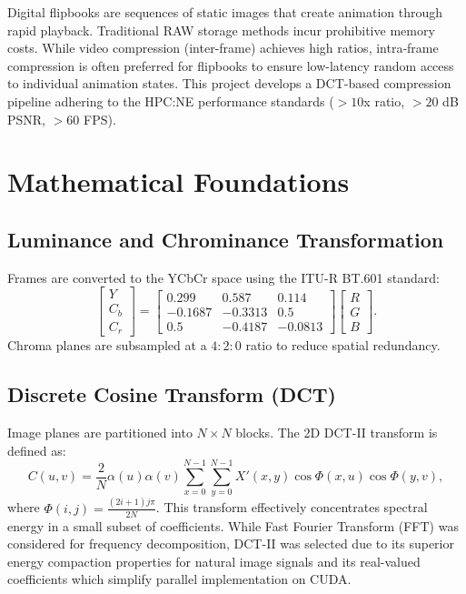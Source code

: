 \documentclass[conference]{IEEEtran}
\begin{document}
Digital flipbooks are sequences of static images that create animation through rapid playback. Traditional RAW storage methods incur prohibitive memory costs. While video compression (inter-frame) achieves high ratios, intra-frame compression is often preferred for flipbooks to ensure low-latency random access to individual animation states. This project develops a DCT-based compression pipeline adhering to the HPC:NE performance standards ($>10$x ratio, $>20$ dB PSNR, $>60$ FPS).

\section{Mathematical Foundations}

\subsection{Luminance and Chrominance Transformation}
Frames are converted to the YCbCr space using the ITU-R BT.601 standard:
\begin{equation}
\begin{bmatrix} Y \\ C_b \\ C_r \end{bmatrix} = 
\begin{bmatrix} 
0.299 & 0.587 & 0.114 \\
-0.1687 & -0.3313 & 0.5 \\
0.5 & -0.4187 & -0.0813
\end{bmatrix}
\begin{bmatrix} R \\ G \\ B \end{bmatrix}.
\end{equation}
Chroma planes are subsampled at a $4{:}2{:}0$ ratio to reduce spatial redundancy.

\subsection{Discrete Cosine Transform (DCT)}
Image planes are partitioned into $N \times N$ blocks. The 2D DCT-II transform is defined as:
\begin{equation}
C(u,v) = \frac{2}{N}\alpha(u)\alpha(v) \sum_{x=0}^{N-1}\sum_{y=0}^{N-1} X'(x,y) \cos \Phi(x,u) \cos \Phi(y,v),
\end{equation}
where $\Phi(i, j) = \frac{(2i+1)j\pi}{2N}$. This transform effectively concentrates spectral energy in a small subset of coefficients. While Fast Fourier Transform (FFT) was considered for frequency decomposition, DCT-II was selected due to its superior energy compaction properties for natural image signals and its real-valued coefficients which simplify parallel implementation on CUDA. 
\end{document}
